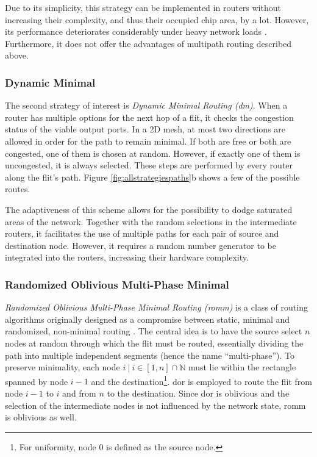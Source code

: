 Due to its simplicity, this strategy can be implemented in routers without increasing their complexity, and thus their occupied chip area, by a lot.
However, its performance deteriorates considerably under heavy network loads \cite[3]{nesson95romm}. Furthermore, it does not offer the advantages of
multipath routing described above.

\subsubsection{Dynamic Minimal}\label{subsubsec:dm}
The second strategy of interest is \textit{Dynamic Minimal Routing (\gls{dm})}. When a router has multiple options for the next hop of a flit, it checks
the congestion status of the viable output ports. In a 2D mesh, at most two directions are allowed in order for the path to remain minimal. If both
are free or both are congested, one of them is chosen at random. However, if exactly one of them is uncongested, it is always selected.
These steps are performed by every router along the flit's path. Figure \ref{fig:allstrategiespaths}b shows a few of the possible routes.

The adaptiveness of this scheme allows for the possibility to dodge saturated areas of the network. Together with the random selections in the
intermediate routers, it facilitates the use of multiple paths for each pair of source and destination node. However, it requires a random number
generator to be integrated into the routers, increasing their hardware complexity.

\subsubsection{Randomized Oblivious Multi-Phase Minimal}\label{subsubsec:romm}
\textit{Randomized Oblivious Multi-Phase Minimal Routing (\gls{romm})} is a class of routing algorithms originally designed as a compromise between
static, minimal and randomized, non-minimal routing \cite[3]{nesson95romm}. The central idea is to have the source select $n$ nodes at random
through which the flit must be routed, essentially dividing the path into multiple independent segments (hence the name \enquote{multi-phase}). To
preserve minimality, each node $i\ |\ i \in [1, n] \cap \mathbb{N}$ must lie within the rectangle spanned by node $i-1$ and the destination\footnote{For uniformity,
node $0$ is defined as the source node.}. \Gls{dor} is employed to route the flit from node $i-1$ to $i$ and from $n$ to the
destination. Since \gls{dor} is oblivious and the selection of the intermediate nodes is not influenced by the network state, \gls{romm} is oblivious
as well.

